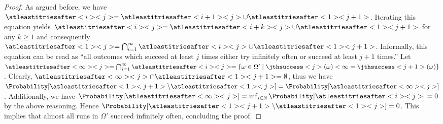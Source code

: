 \documentclass{article}
\newcommand{\unionSym}{\cup}
\newcommand{\unionBin}{\mathbin{\unionSym}}
\newcommand{\intersectionSym}{\cap}
\newcommand{\intersectionBin}{\mathbin{\intersectionSym}}
\newcommand{\IntersectionSym}{\bigcap}
\newcommand{\union}{\unionBin}
\newcommand{\intersection}{\intersectionBin}
\newcommand{\Intersection}{\IntersectionSym}
\newcommand{\Naturals}{\mathbb{N}}
\begin{document}
\begin{proof}
	As argued before, we have $\atleastitriesafter<i><j> = \atleastitriesafter<i+1><j> \union \atleastitriesafter<1><j+1>$.
	Iterating this equation yields $\atleastitriesafter<i><j> = \atleastitriesafter<i+k><j> \union \atleastitriesafter<1><j+1>$ for any $k \geq 1$ and consequently $\atleastitriesafter<1><j> = \Intersection_{i=1}^\infty \atleastitriesafter<i><j> \union \atleastitriesafter<1><j+1>$.
	Informally, this equation can be read as \enquote{all outcomes which succeed at least $j$ times either try infinitely often or succeed at least $j+1$ times.}
	Let $\atleastitriesafter<\infty><j> = \Intersection_{i=1}^\infty \atleastitriesafter<i><j> = \{\omega \in \Omega' \mid \jthsuccess<j>(\omega) < \infty = \jthsuccess<j+1>(\omega)\}$.
	Clearly, $\atleastitriesafter<\infty><j> \intersection \atleastitriesafter<1><j+1> = \emptyset$, thus we have $\Probability[\atleastitriesafter<1><j+1> \setminus \atleastitriesafter<1><j>] = \Probability[\atleastitriesafter<\infty><j>]$.
	Additionally, we have $\Probability[\atleastitriesafter<\infty><j>] = \inf_{i \in \Naturals} \Probability[\atleastitriesafter<i><j>] = 0$ by the above reasoning.
	Hence $\Probability[\atleastitriesafter<1><j+1> \setminus \atleastitriesafter<1><j>] = 0$.
	This implies that almost all runs in $\Omega'$ succeed infinitely often, concluding the proof. 
\end{proof}
\end{document}
